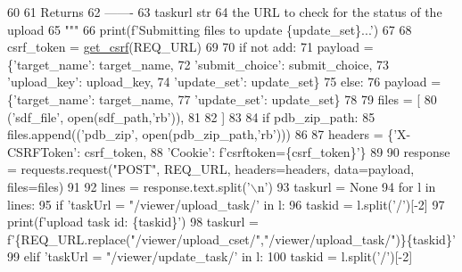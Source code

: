 \begin{DoxyCode}
60 \textcolor{stringliteral}{        }
61 \textcolor{stringliteral}{    Returns}
62 \textcolor{stringliteral}{    -------}
63 \textcolor{stringliteral}{    taskurl str}
64 \textcolor{stringliteral}{        the URL to check for the status of the upload}
65 \textcolor{stringliteral}{    """}
66     print(f\textcolor{stringliteral}{'Submitting files to update \{update\_set\}...'})
67     
68     csrf\_token = \hyperlink{namespacefragalysis__api_1_1xcextracter_1_1computed__set__update_a5737d189121121fcfc89d399bf38e877}{get\_csrf}(REQ\_URL)
69     
70     \textcolor{keywordflow}{if} \textcolor{keywordflow}{not} add:
71         payload = \{\textcolor{stringliteral}{'target\_name'}: target\_name,
72                    \textcolor{stringliteral}{'submit\_choice'}: submit\_choice,
73                    \textcolor{stringliteral}{'upload\_key'}: upload\_key,
74                    \textcolor{stringliteral}{'update\_set'}: update\_set\}
75     \textcolor{keywordflow}{else}:
76         payload = \{\textcolor{stringliteral}{'target\_name'}: target\_name,
77                    \textcolor{stringliteral}{'update\_set'}: update\_set\}
78 
79     files = [
80         (\textcolor{stringliteral}{'sdf\_file'}, open(sdf\_path,\textcolor{stringliteral}{'rb'})),
81         
82     ]
83     
84     \textcolor{keywordflow}{if} pdb\_zip\_path:
85         files.append((\textcolor{stringliteral}{'pdb\_zip'}, open(pdb\_zip\_path,\textcolor{stringliteral}{'rb'})))
86 
87     headers = \{\textcolor{stringliteral}{'X-CSRFToken'}: csrf\_token,
88               \textcolor{stringliteral}{'Cookie'}: f\textcolor{stringliteral}{'csrftoken=\{csrf\_token\}'}\}
89     
90     response = requests.request(\textcolor{stringliteral}{"POST"}, REQ\_URL, headers=headers, data=payload, files=files)
91     
92     lines = response.text.split(\textcolor{stringliteral}{'\(\backslash\)n'})
93     taskurl = \textcolor{keywordtype}{None}
94     \textcolor{keywordflow}{for} l \textcolor{keywordflow}{in} lines:
95         \textcolor{keywordflow}{if} \textcolor{stringliteral}{'taskUrl = "/viewer/upload\_task/'} \textcolor{keywordflow}{in} l:
96             taskid = l.split(\textcolor{stringliteral}{'/'})[-2]
97             print(f\textcolor{stringliteral}{'upload task id: \{taskid\}'})
98             taskurl = f\textcolor{stringliteral}{'\{REQ\_URL.replace("/viewer/upload\_cset/","/viewer/upload\_task/")\}\{taskid\}'}
99         \textcolor{keywordflow}{elif} \textcolor{stringliteral}{'taskUrl = "/viewer/update\_task/'} \textcolor{keywordflow}{in} l:
100             taskid = l.split(\textcolor{stringliteral}{'/'})[-2]

\end{DoxyCode}
